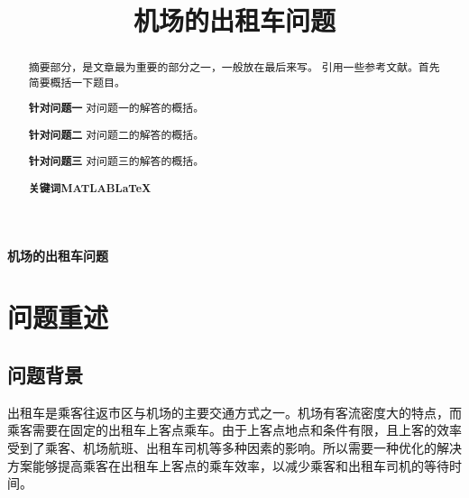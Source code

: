 \documentclass{cumcm}
\title{机场的出租车问题}
\begin{document}
 

\begin{minipage}{0.9\textwidth}
\centering\LARGE\textbf{机场的出租车问题}
\end{minipage}

\begin{abstract}
	摘要部分，是文章最为重要的部分之一，一般放在最后来写。
	引用一些参考文献。首先简要概括一下题目。\par
	\textbf{针对问题一}\quad
	对问题一的解答的概括。\par
	\textbf{针对问题二}\quad
	对问题二的解答的概括。\par
	\textbf{针对问题三}\quad
	对问题三的解答的概括。
\\\par
\textbf{关键词\quad MATLAB\quad \LaTeX}
\end{abstract}

\newpage
\section{问题重述}
\subsection{问题背景}
出租车是乘客往返市区与机场的主要交通方式之一。机场有客流密度大的特点，而乘客需要在固定的出租车上客点乘车。由于上客点地点和条件有限，且上客的效率受到了乘客、机场航班、出租车司机等多种因素的影响。所以需要一种优化的解决方案能够提高乘客在出租车上客点的乘车效率，以减少乘客和出租车司机的等待时间。
\end{document}
